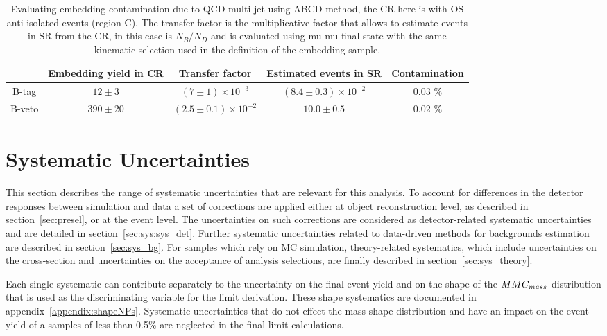 \begin{table} [tp]
\centering
\begin{tabular}{c c c c c}
\hline
\hline
 & Embedding yield in CR & Transfer factor & Estimated events in SR & Contamination \\ [0.5ex]
\hline
B-tag  & $12 \pm 3$ & $ (7 \pm 1) \times 10^{-3}$ &  $(8.4 \pm 0.3) \times 10^{-2}$ &  0.03 \% \\
B-veto & $390 \pm 20$ & $(2.5 \pm 0.1) \times 10^{-2}$ & $10.0 \pm 0.5$ & 0.02 \% \\[1ex]
\hline
\end{tabular}
\caption{Evaluating embedding contamination due to QCD multi-jet using ABCD method, 
the CR here is with OS anti-isolated events (region C). The transfer factor is the
multiplicative factor that allows to estimate events in SR from the CR, in this case is $N_{B} / N_{D}$
and is evaluated using mu-mu final state with the same kinematic selection used in the 
definition of the embedding sample. }
\label{table:emb_cont_qcd}
\end{table}


\section{Systematic Uncertainties}
\label{sec:Systematics}

This section describes the range of systematic uncertainties
that are relevant for this analysis. To account for differences in the detector responses between simulation and data a 
set of corrections are applied either at object reconstruction level, as described in section~\ref{sec:presel}, or at the event level. 
The uncertainties on such corrections are considered as detector-related systematic uncertainties and are detailed in section~\ref{sec:sys:sys_det}. Further systematic uncertainties related to data-driven methods for backgrounds estimation
are described in section~\ref{sec:sys_bg}.  For
samples which rely on MC simulation, theory-related
systematics, which include uncertainties on the cross-section and
uncertainties on the acceptance of analysis selections,  
are finally described in section~\ref{sec:sys_theory}.

Each single systematic can contribute separately to the uncertainty on the
final event yield and on the shape of the $MMC_{mass}$
distribution that is used as the discriminating variable for the limit derivation. These shape systematics are
documented in appendix~\ref{appendix:shapeNPs}. Systematic uncertainties that do not effect the
mass shape distribution and have an impact on the event yield of a samples of less than 0.5\% are 
neglected in the final limit calculations.


